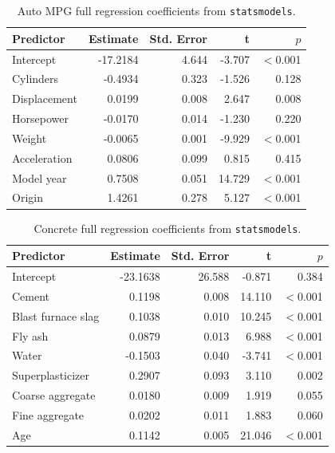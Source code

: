 \documentclass{article}
\begin{document}
\begin{table}[H]
\centering
\small
\caption{Auto MPG full regression coefficients from \texttt{statsmodels}.}
\label{tab:auto-statsmodels-coefficients}
\begin{tabular}{lrrrr}
\hline
Predictor & Estimate & Std. Error & t & $p$ \\
\hline
Intercept    & -17.2184 & 4.644 & -3.707 & $<$0.001 \\
Cylinders    & -0.4934 & 0.323 & -1.526 & 0.128 \\
Displacement & 0.0199 & 0.008 & 2.647 & 0.008 \\
Horsepower   & -0.0170 & 0.014 & -1.230 & 0.220 \\
Weight       & -0.0065 & 0.001 & -9.929 & $<$0.001 \\
Acceleration & 0.0806 & 0.099 & 0.815 & 0.415 \\
Model year   & 0.7508 & 0.051 & 14.729 & $<$0.001 \\
Origin       & 1.4261 & 0.278 & 5.127 & $<$0.001 \\
\hline
\end{tabular}
\end{table}

\begin{table}[H]
\centering
\small
\caption{Concrete full regression coefficients from \texttt{statsmodels}.}
\label{tab:concrete-statsmodels-coefficients}
\begin{tabular}{lrrrr}
\hline
Predictor & Estimate & Std. Error & t & $p$ \\
\hline
Intercept & -23.1638 & 26.588 & -0.871 & 0.384 \\
Cement & 0.1198 & 0.008 & 14.110 & $<$0.001 \\
Blast furnace slag & 0.1038 & 0.010 & 10.245 & $<$0.001 \\
Fly ash & 0.0879 & 0.013 & 6.988 & $<$0.001 \\
Water & -0.1503 & 0.040 & -3.741 & $<$0.001 \\
Superplasticizer & 0.2907 & 0.093 & 3.110 & 0.002 \\
Coarse aggregate & 0.0180 & 0.009 & 1.919 & 0.055 \\
Fine aggregate & 0.0202 & 0.011 & 1.883 & 0.060 \\
Age & 0.1142 & 0.005 & 21.046 & $<$0.001 \\
\hline
\end{tabular}
\end{table}
\end{document}

